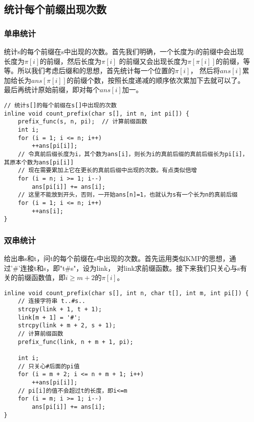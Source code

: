     \subsection{统计每个前缀出现次数}
        \subsubsection{单串统计}
            统计s的每个前缀在s中出现的次数。首先我们明确，一个长度为i的前缀中会出现长度为$\pi[i]$的前缀，然后长度为$\pi[i]$
            的前缀又会出现长度为$\pi[\pi[i]]$的前缀，等等。所以我们考虑后缀和的思想，首先统计每一个位置的$\pi[i]$，
            然后将$ans[i]$累加给长为$ans[\pi[i]]$的前缀个数，按照长度递减的顺序依次累加下去就可以了。
            最后再统计原始前缀，即对每个$ans[i]$加一。
            \begin{lstlisting}
// 统计s[]的每个前缀在s[]中出现的次数
inline void count_prefix(char s[], int n, int pi[]) {
    prefix_func(s, n, pi);  // 计算前缀函数
    int i;
    for (i = 1; i <= n; i++)
        ++ans[pi[i]];
    // 令真前后缀长度为i，其个数为ans[i]，则长为i的真前后缀的真前后缀长为pi[i]，其原本个数为ans[pi[i]]
    // 现在需要累加上它在更长的真前后缀中出现的次数。有点类似倍增
    for (i = n; i >= 1; i--)
        ans[pi[i]] += ans[i];
    // 这里不能放到开头，否则，一开始ans[n]=1，也就认为s有一个长为n的真前后缀
    for (i = 1; i <= n; i++)
        ++ans[i];
}
            \end{lstlisting}
        \subsubsection{双串统计}
            给出串s和t，问t的每个前缀在s中出现的次数。首先运用类似KMP的思想，通过'\#'连接t和s，即"t\#s"，设为link，
            对link求前缀函数。接下来我们只关心与s有关的前缀函数值，即$i \ge m+2$的$\pi[i]$。
            \begin{lstlisting}
inline void count_prefix(char s[], int n, char t[], int m, int pi[]) {
    // 连接字符串 t..#s..
    strcpy(link + 1, t + 1);
    link[m + 1] = '#';
    strcpy(link + m + 2, s + 1);
    // 计算前缀函数
    prefix_func(link, n + m + 1, pi);

    int i;
    // 只关心#后面的pi值
    for (i = m + 2; i <= n + m + 1; i++)
        ++ans[pi[i]];
    // pi[i]的值不会超过t的长度，即i<=m
    for (i = m; i >= 1; i--)
        ans[pi[i]] += ans[i];
}
            \end{lstlisting}
